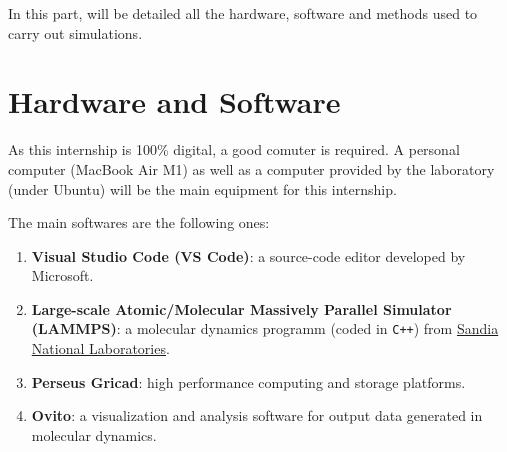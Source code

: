 
In this part, will be detailed all the hardware, software and methods used to carry out simulations. 

\section{Hardware and Software}

    As this internship is 100\% digital, a good comuter is required. A personal computer (MacBook Air M1) as well as a computer provided by the laboratory (under Ubuntu) will be the main equipment for this internship. \medskip

    The main softwares are the following ones:

    \begin{enumerate}[\hspace{3em}$\bullet$]
        \item \textbf{Visual Studio Code (VS Code)}: a source-code editor developed by Microsoft.
        \item \textbf{Large-scale Atomic/Molecular Massively Parallel Simulator (LAMMPS)}: a molecular dynamics programm (coded in \verb|C++|) from \href{http://www.sandia.gov}{Sandia National Laboratories}.
        \item \textbf{Perseus Gricad}: high performance computing and storage platforms.  
        \item \textbf{Ovito}: a visualization and analysis software for output data generated in molecular dynamics. 
    \end{enumerate}